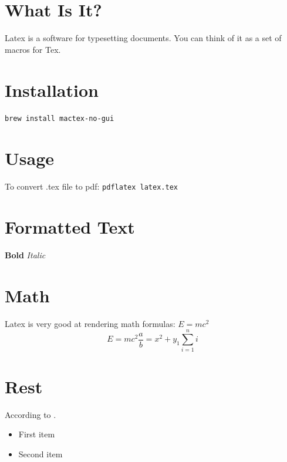 \documentclass{article}
\begin{document}
\section{What Is It?}
Latex is a software for typesetting documents. You can think of it as a set of macros for Tex.
\section{Installation}
\texttt{brew install mactex-no-gui}
\section{Usage}
To convert .tex file to pdf: \texttt{pdflatex latex.tex}
\section{Formatted Text}
\textbf{Bold}
\textit{Italic}
\section{Math}
Latex is very good at rendering math formulas:
$E = mc^2$
\[
E = mc ^ 2
\frac{a}{b} = x^2 + y_1
\sum_{i=1}^{n} i
\]
\section{Rest}
According to \cite{knuth1984}.

\begin{itemize}
 \item First item
 \item Second item
\end{itemize}
\end{document}
